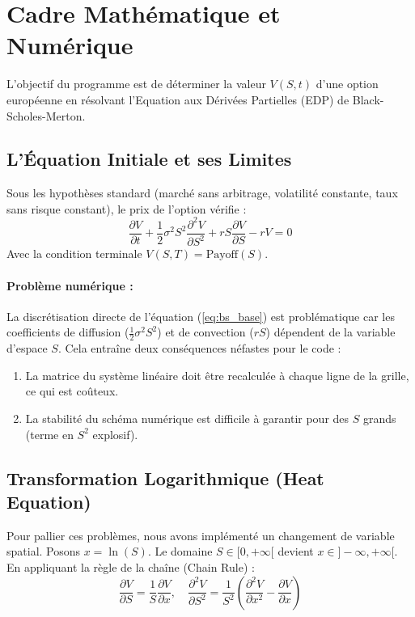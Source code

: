 \documentclass[a4paper,12pt]{article}
\begin{document}
\section{Cadre Mathématique et Numérique}

L'objectif du programme est de déterminer la valeur $V(S,t)$ d'une option européenne en résolvant l'Equation aux Dérivées Partielles (EDP) de Black-Scholes-Merton.

\subsection{L'Équation Initiale et ses Limites}
Sous les hypothèses standard (marché sans arbitrage, volatilité constante, taux sans risque constant), le prix de l'option vérifie :
\begin{equation}
    \frac{\partial V}{\partial t} + \frac{1}{2}\sigma^2 S^2 \frac{\partial^2 V}{\partial S^2} + rS \frac{\partial V}{\partial S} - rV = 0
    \label{eq:bs_base}
\end{equation}
Avec la condition terminale $V(S, T) = \text{Payoff}(S)$.

\paragraph{Problème numérique :}
La discrétisation directe de l'équation (\ref{eq:bs_base}) est problématique car les coefficients de diffusion ($\frac{1}{2}\sigma^2 S^2$) et de convection ($rS$) dépendent de la variable d'espace $S$. Cela entraîne deux conséquences néfastes pour le code :
\begin{enumerate}
    \item La matrice du système linéaire doit être recalculée à chaque ligne de la grille, ce qui est coûteux.
    \item La stabilité du schéma numérique est difficile à garantir pour des $S$ grands (terme en $S^2$ explosif).
\end{enumerate}

\subsection{Transformation Logarithmique (Heat Equation)}
Pour pallier ces problèmes, nous avons implémenté un changement de variable spatial.
Posons $x = \ln(S)$. Le domaine $S \in [0, +\infty[$ devient $x \in ]-\infty, +\infty[$.
En appliquant la règle de la chaîne (Chain Rule) :
$$ \frac{\partial V}{\partial S} = \frac{1}{S}\frac{\partial V}{\partial x}, \quad \frac{\partial^2 V}{\partial S^2} = \frac{1}{S^2}\left(\frac{\partial^2 V}{\partial x^2} - \frac{\partial V}{\partial x}\right) $$
\end{document}
